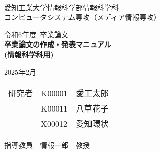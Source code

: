 \begin{titlepage}

\ \\
\begin{center}

{\LARGE 愛知工業大学情報科学部情報科学科\\
コンピュータシステム専攻（メディア情報専攻）

\vspace{1.0cm}

令和6年度~卒業論文\\

\vspace{2.0cm}
{\Huge
\baselineskip=15mm
\textbf{卒業論文の作成・発表マニュアル\\
(情報科学科用)\\}}

\vspace{7.0cm}

2025年2月\\

\vspace{1.0cm}

\begin{tabular}[h]{lll}
  研究者  & K00001 & 愛工太郎\\
         & K00011 & 八草花子\\
         & X00012 & 愛知環状\\
\end{tabular}

\vspace{1.0cm}

指導教員\ \ 情報一郎\ \ 教授}

\end{center}

\end{titlepage}
